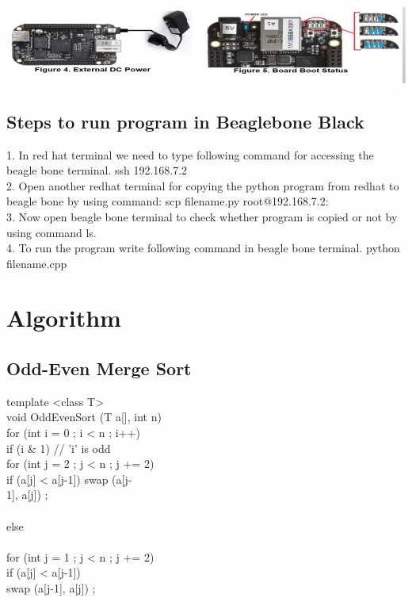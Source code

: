 \documentclass[a4paper,12pt]{article}
\begin{document}
	\includegraphics[width=\textwidth]{bbb_02}
	
	\subsection{Steps to run program in Beaglebone Black}
	1.	In red hat terminal we need to type following command for accessing the beagle bone terminal. 
	ssh 192.168.7.2 \\
	2.	Open another redhat terminal for copying the python program from redhat to beagle bone by using command: 
	scp filename.py root@192.168.7.2: \\
	3.	Now open beagle bone terminal to check whether program is copied or not by using command ls. \\
	4.	To run the program write following command in beagle bone terminal. 
	python filename.cpp \\
	
\section{Algorithm}
	\subsection{Odd-Even Merge Sort}
	template <class T> 									\\
	void OddEvenSort (T a[], int n) 					\\
	{ for (int i = 0 ; i < n ; i++) 					\\
		{ if (i \& 1) // 'i' is odd 					\\
			{ for (int j = 2 ; j < n ; j += 2) 			\\
				{ if (a[j] < a[j-1]) swap (a[j-			\\
					1], a[j]) ; 						\\
				} 										\\
			} else 										\\
			{ 											\\
				for (int j = 1 ; j < n ; j += 2) { 		\\
					if (a[j] < a[j-1]) 					\\
					swap (a[j-1], a[j]) ; 				\\
				} 										\\
			} 											\\
		} 												\\
	} 													\\
														\\
	
\end{document}
